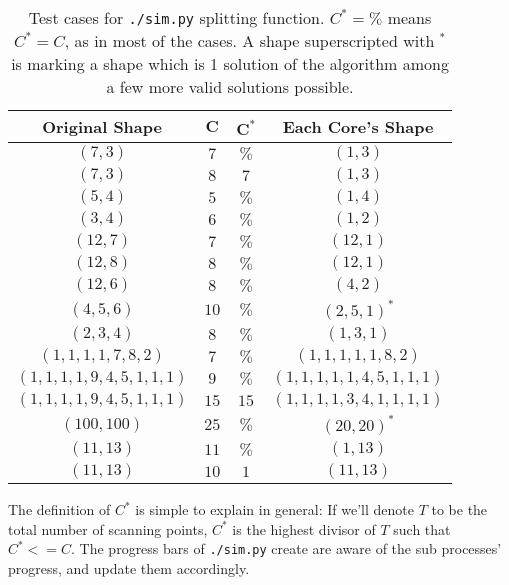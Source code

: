 \begin{table}
  \centering
  \begin{tabular}{cccc}
    \toprule
    \textbf{Original Shape} & $\mathbf{C}$ & $\mathbf{C^*}$ & \textbf{Each Core's Shape} \\
    \midrule
    $(7, 3)$                         & $7$  & $\%$ & $(1, 3)$ \\
    $(7, 3)$                         & $8$  & $7$  & $(1, 3)$ \\
    $(5, 4)$                         & $5$  & $\%$ & $(1, 4)$ \\
    $(3, 4)$                         & $6$  & $\%$ & $(1, 2)$ \\
    $(12, 7)$                        & $7$  & $\%$ & $(12, 1)$ \\
    $(12, 8)$                        & $8$  & $\%$ & $(12, 1)$ \\
    $(12, 6)$                        & $8$  & $\%$ & $(4, 2)$ \\
    $(4, 5, 6)$                      & $10$ & $\%$ & $(2, 5, 1)^*$ \\
    $(2, 3, 4)$                      & $8$  & $\%$ & $(1, 3, 1)$ \\
    $(1, 1, 1, 1, 7, 8, 2)$          & $7$  & $\%$ & $(1, 1, 1, 1, 1, 8, 2)$ \\
    $(1, 1, 1, 1, 9, 4, 5, 1, 1, 1)$ & $9$  & $\%$ & $(1, 1, 1, 1, 1, 4, 5, 1, 1, 1)$ \\
    $(1, 1, 1, 1, 9, 4, 5, 1, 1, 1)$ & $15$ & $15$ & $(1, 1, 1, 1, 3, 4, 1, 1, 1, 1)$ \\
    $(100, 100)$                     & $25$ & $\%$ & $(20, 20)^*$ \\
    $(11, 13)$                       & $11$ & $\%$ & $(1, 13)$ \\
    $(11, 13)$                       & $10$ & $1$  & $(11, 13)$ \\
    \bottomrule
  \end{tabular}
  \caption{Test cases for \texttt{./sim.py} splitting function. $C^* = \%$ means $C^* = C$, as in most of the cases. A shape superscripted with ${}^*$ is marking a shape which is 1 solution of the algorithm among a few more valid solutions possible.}
  \label{tbl:--cores-splitting-examples}
\end{table}

The definition of $C^*$ is simple to explain in general: If we'll denote $T$ to be the total number of scanning points, $C^*$ is the highest divisor of $T$ such that $C^* <= C$. The progress bars of \texttt{./sim.py} create are aware of the sub processes' progress, and update them accordingly.

